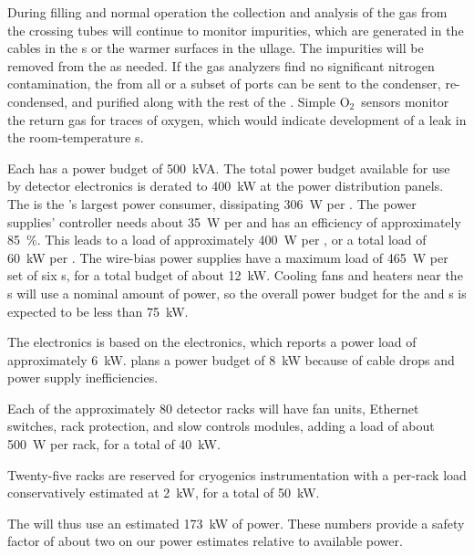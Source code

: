 During filling and normal operation the collection and analysis of the gas from the crossing tubes will continue to %
monitor impurities, which are generated in the cables in the \fdth{}s or the warmer surfaces in the ullage. The impurities will be removed from the  as needed.
 If the gas analyzers find no significant nitrogen contamination, the  from all or a subset of ports can be sent to the condenser, re-condensed, and purified along with the rest of the . Simple O$_2$\ sensors monitor the return gas for traces of oxygen, which would indicate development of a leak in the room-temperature \fdth{}s.

Each  has a power budget of \SI{500}{kVA}. The total power budget available for use by detector electronics is derated to \SI{400}{kW} at the power distribution panels.  The  is the 's largest power consumer,   
dissipating \SI{306}{W} per .  
The  power supplies' controller needs about \SI{35}{W} per  and has an efficiency of approximately \SI{85}{\%}. This leads to a load of  approximately  \SI{400}{W}  per , or a total load of  \SI{60}{kW} per .  The  wire-bias power supplies have a maximum load of  \SI{465}{W} per set of six s, for a total budget of about   \SI{12}{kW}.   Cooling fans and heaters near the \fdth{}s will use a nominal amount of power, so the overall power budget for the  and  s
is expected to be less than \SI{75}{kW}.


The  electronics is based on the  electronics, which reports a power load of approximately  \SI{6}{kW}.   plans a power budget of  \SI{8}{kW} because of cable drops and  power supply inefficiencies.  

Each of the approximately 80 detector racks will have fan units, Ethernet switches, rack protection, and slow controls modules, adding a load of about \SI{500}{W} per rack, for a total of \SI{40}{kW}.

Twenty-five racks are reserved for cryogenics instrumentation with a per-rack load conservatively estimated at \SI{2}{kW}, for a total of \SI{50}{kW}. 

The  will thus use  an estimated \SI{173}{kW} of power.   These numbers provide a safety factor of about two on our power estimates relative to available power.


